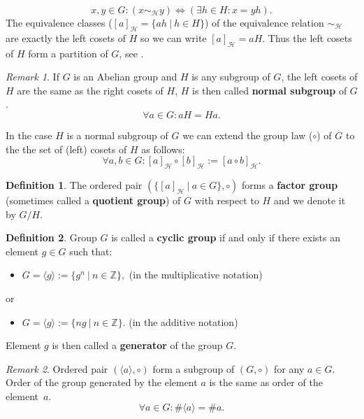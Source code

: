 \documentclass[thesis=M,english]{FITthesis}[2012/10/20]
\theoremstyle{remark}
\newtheorem*{RM}{Remark}
\theoremstyle{definition}
\newtheorem{DF}{Definition}[section]
\begin{document}
$$
x,y \in G: (x \sim_{\mathcal{H}} y) \Leftrightarrow (\exists h \in H: x = yh).
$$
The equivalence classes ($[a]_{\mathcal{H}} = \{ah\ |\ h \in H \}$) of the equivalence relation $\sim_{\mathcal{H}}$ are exactly the left cosets of $H$ so we can write $[a]_{\mathcal{H}} = aH$. Thus the left cosets of $H$ form a partition of $G$, see \cite{coset}.
\begin{RM}
If $G$ is an Abelian group and $H$ is any subgroup of $G$, the left cosets of $H$ are the same as the right cosets of $H$, $H$ is then called \textbf{normal subgroup} of $G$. 
$$
\forall a \in G: aH = Ha.
$$ 
\end{RM} 
\noindent In the case $H$ is a normal subgroup of $G$ we can extend the group law ($\circ$) of $G$ to the the set of (left) cosets of $H$ as follows:
$$
\forall a,b \in G: [a]_{\mathcal{H}} \circ [b]_{\mathcal{H}} := [a \circ b]_{\mathcal{H}}.
$$
\begin{DF}
The ordered pair $(\{[a]_{\mathcal{H}}\ |\ a \in G\}, \circ)$ forms a \textbf{factor group} (sometimes called a \textbf{quotient group}) of $G$ with respect to $H$ and we denote it by $G/H$.
\end{DF}
\begin{DF}
Group $G$ is called a \textbf{cyclic group} if and only if there exists an element $g \in G$ such that:
\begin{itemize}
\item $G = \langle g \rangle := \{ g^n\ |\ n \in \mathbb{Z} \},$ \hfill (in the multiplicative notation) 
\end{itemize}
or
\begin{itemize}
\item $G = \langle g \rangle := \{ ng\ |\ n \in \mathbb{Z} \}.$ \hfill (in the additive notation)
\end{itemize}
\end{DF}
\noindent Element $g$ is then called a \textbf{generator} of the group $G$.
\begin{RM}
Ordered pair $(\langle a \rangle, \circ)$ form a subgroup of $(G, \circ)$ for any $a \in G$. Order of the group generated by the element $a$ is the same as order of the element~$a$. 
$$
\forall a \in G: \#\langle a \rangle = \#a.
$$
\end{RM}
\end{document}
